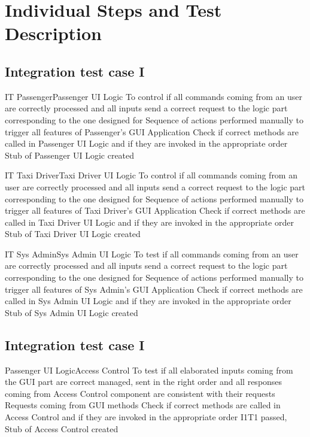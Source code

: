 \newpage
\section{Individual Steps and Test Description}

\subsection{Integration test case I}

\tctable
{IT}
{Passenger\textrightarrow Passenger UI Logic}
{To control if all commands coming from an user are correctly processed and all inputs send a correct request to the logic part corresponding to the one designed for}
{Sequence of actions performed manually to trigger all features of Passenger's GUI Application}
{Check if correct methods are called in Passenger UI Logic and if they are invoked in the appropriate order}
{Stub of Passenger UI Logic created}

\vspace{2ex}
\tctable
{IT}
{Taxi Driver\textrightarrow Taxi Driver UI Logic}
{To control if all commands coming from an user are correctly processed and all inputs send a correct request to the logic part corresponding to the one designed for}
{Sequence of actions performed manually to trigger all features of Taxi Driver's GUI Application}
{Check if correct methods are called in Taxi Driver UI Logic and if they are invoked in the appropriate order}
{Stub of Taxi Driver UI Logic created}

\vspace{2ex}
\tctable
{IT}
{Sys Admin\textrightarrow Sys Admin UI Logic}
{To test if all commands coming from an user are correctly processed and all inputs send a correct request to the logic part corresponding to the one designed for}
{Sequence of actions performed manually to trigger all features of Sys Admin's GUI Application}
{Check if correct methods are called in Sys Admin UI Logic and if they are invoked in the appropriate order}
{Stub of Sys Admin UI Logic created}


\subsection{Integration test case I}
\setcounter{testcounter}{1}
{Passenger UI Logic\textrightarrow Access Control}
{To test if all elaborated inputs coming from the GUI part are correct managed, sent in the right order and all responses coming from Access Control component are consistent with their requests}
{Requests coming from GUI methods}
{Check if correct methods are called in Access Control and if they are invoked in the appropriate order}
{I1T1 passed, Stub of Access Control created}

